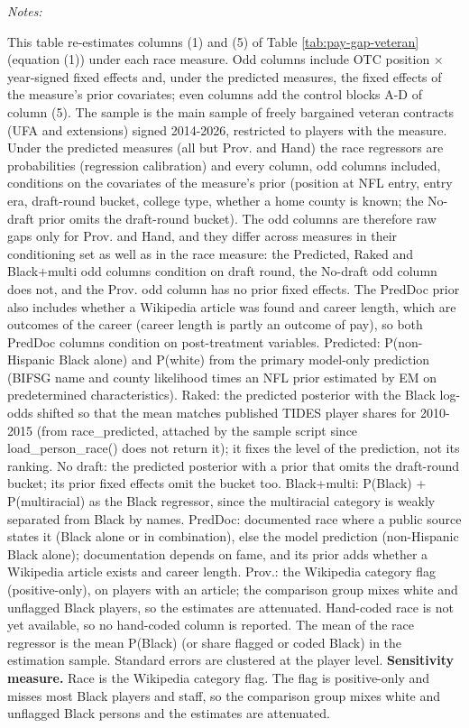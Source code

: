 \begin{table}[!h]
{\begin{threeparttable}
\begin{tabular}[t]{lcccccccccccc}
\end{tabular}
\begin{tablenotes}[para]
\item \textit{Notes:} 
\item This table re-estimates columns (1) and (5) of Table \ref{tab:pay-gap-veteran} (equation (1)) under each race measure. Odd columns include OTC position $\times$ year-signed fixed effects and, under the predicted measures, the fixed effects of the measure's prior covariates; even columns add the control blocks A-D of column (5). The sample is the main sample of freely bargained veteran contracts (UFA and extensions) signed 2014-2026, restricted to players with the measure. Under the predicted measures (all but Prov. and Hand) the race regressors are probabilities (regression calibration) and every column, odd columns included, conditions on the covariates of the measure's prior (position at NFL entry, entry era, draft-round bucket, college type, whether a home county is known; the No-draft prior omits the draft-round bucket). The odd columns are therefore raw gaps only for Prov. and Hand, and they differ across measures in their conditioning set as well as in the race measure: the Predicted, Raked and Black+multi odd columns condition on draft round, the No-draft odd column does not, and the Prov. odd column has no prior fixed effects. The PredDoc prior also includes whether a Wikipedia article was found and career length, which are outcomes of the career (career length is partly an outcome of pay), so both PredDoc columns condition on post-treatment variables. Predicted: P(non-Hispanic Black alone) and P(white) from the primary model-only prediction (BIFSG name and county likelihood times an NFL prior estimated by EM on predetermined characteristics). Raked: the predicted posterior with the Black log-odds shifted so that the mean matches published TIDES player shares for 2010-2015 (from race\_predicted, attached by the sample script since load\_person\_race() does not return it); it fixes the level of the prediction, not its ranking. No draft: the predicted posterior with a prior that omits the draft-round bucket; its prior fixed effects omit the bucket too. Black+multi: P(Black) + P(multiracial) as the Black regressor, since the multiracial category is weakly separated from Black by names. PredDoc: documented race where a public source states it (Black alone or in combination), else the model prediction (non-Hispanic Black alone); documentation depends on fame, and its prior adds whether a Wikipedia article exists and career length. Prov.: the Wikipedia category flag (positive-only), on players with an article; the comparison group mixes white and unflagged Black players, so the estimates are attenuated. Hand-coded race is not yet available, so no hand-coded column is reported. The mean of the race regressor is the mean P(Black) (or share flagged or coded Black) in the estimation sample. Standard errors are clustered at the player level. \textbf{Sensitivity measure.} Race is the Wikipedia category flag. The flag is positive-only and misses most Black players and staff, so the comparison group mixes white and unflagged Black persons and the estimates are attenuated.

\end{tablenotes}
\end{threeparttable}}
\end{table}
